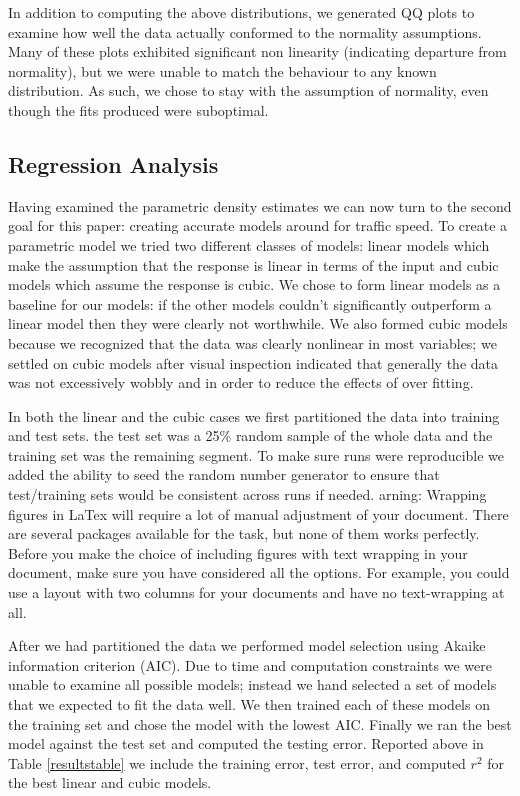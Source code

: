 \documentclass[12pt]{article}
\begin{document}
In addition to computing the above distributions, we generated QQ plots to examine how well the data actually conformed to the normality assumptions. Many of these plots exhibited significant non linearity (indicating departure from normality), but we were unable to match the behaviour to any known distribution. As such, we chose to stay with the assumption of normality, even though the fits produced were suboptimal.
\subsection{Regression Analysis}
Having examined the parametric density estimates we can now turn to the second goal for this paper: creating accurate models around for traffic speed. To create a parametric model we tried two different classes of  models: linear models which make the assumption that the response is linear in terms of the input and cubic models which assume the response is cubic. We chose to form linear models as a baseline for our models: if the other models couldn't significantly outperform a linear model then they were clearly not worthwhile. We also formed cubic models because we recognized that the data was clearly nonlinear in most variables; we settled on cubic models after visual inspection indicated that generally the data was not excessively wobbly and in order to reduce the effects of over fitting.

In both the linear and the cubic cases we first partitioned the data into training and test sets. the test set was a 25\% random sample of the whole data and the training set was the remaining segment. To make sure runs were reproducible we added the ability to seed the random number generator to ensure that test/training sets would be consistent across runs if needed. arning: Wrapping figures in LaTex will require a lot of manual adjustment of your document. There are several packages available for the task, but none of them works perfectly. Before you make the choice of including figures with text wrapping in your document, make sure you have considered all the options. For example, you could use a layout with two columns for your documents and have no text-wrapping at all.

After we had partitioned the data we performed model selection using Akaike information criterion (AIC). Due to time and computation constraints we were unable to examine all possible models; instead we hand selected a set of models that we expected to fit the data well. We then trained each of these models on the training set and chose the model with the lowest AIC. Finally we ran the best model against the test set and computed the testing error. Reported above in Table \ref{resultstable} we include the training error, test error, and computed $r^2$ for the best linear and cubic models. 
\end{document}
